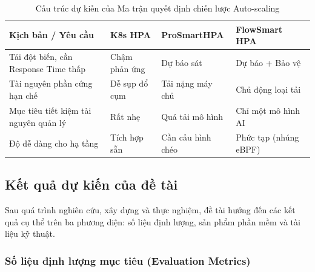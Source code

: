 \documentclass[14pt]{article}
\begin{document}
\begin{table}[H]
\centering
\caption{Cấu trúc dự kiến của Ma trận quyết định chiến lược Auto-scaling}
\label{table:decision_matrix_mock}
\renewcommand{\arraystretch}{1.4}
\begin{tabular}{|>{\raggedright\arraybackslash}p{4cm}|>{\centering\arraybackslash}p{3.5cm}|>{\centering\arraybackslash}p{3.5cm}|>{\centering\arraybackslash}p{3.5cm}|}
\hline
\textbf{Kịch bản / Yêu cầu} & \textbf{K8s HPA} & \textbf{ProSmartHPA} & \textbf{FlowSmart HPA} \\ \hline
Tải đột biến, cần Response Time thấp & Chậm phản ứng & Dự báo sát & Dự báo + Bảo vệ \\ \hline
Tài nguyên phần cứng hạn chế & Dễ sụp đổ cụm & Tải nặng máy chủ & Chủ động loại tải \\ \hline
Mục tiêu tiết kiệm tài nguyên quản lý & Rất nhẹ & Quá tải mô hình & Chỉ một mô hình AI \\ \hline
Độ dễ dàng cho hạ tầng & Tích hợp sẵn & Cần cấu hình chéo & Phức tạp (nhúng eBPF) \\ \hline
\end{tabular}
\end{table}

\subsection{Kết quả dự kiến của đề tài}

Sau quá trình nghiên cứu, xây dựng và thực nghiệm, đề tài hướng đến các kết quả cụ thể trên ba phương diện: số liệu định lượng, sản phẩm phần mềm và tài liệu kỹ thuật.

\subsubsection{Số liệu định lượng mục tiêu (Evaluation Metrics)}
\end{document}
